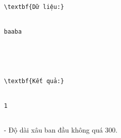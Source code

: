 \begin{verbatim}
\textbf{Dữ liệu:}


baaba





\textbf{Kết quả:}


1


\end{verbatim}
- Độ dài xâu ban đầu không quá 300.